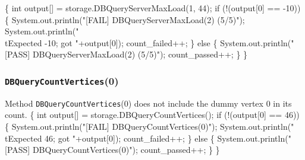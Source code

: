 \documentclass{article}
\def\nwendcode{\endtrivlist \endgroup}
\let\nwdocspar=\par
\begin{document}
\nwenddocs{}\endmoddef{}
\{
  int output[] = storage.DBQueryServerMaxLoad(1, 44);
  if (!(output[0] == -10)) \{
    System.out.println("[FAIL] DBQueryServerMaxLoad(2) (5/5)");
    System.out.println("\\tExpected -10; got "+output[0]);
    count_failed++;
  \} else \{
    System.out.println("[PASS] DBQueryServerMaxLoad(2) (5/5)");
    count_passed++;
  \}
\}
\nwendcode{}\nwdocspar
\subsubsection{{\tt{}DBQueryCountVertices}(0)}
Method {\tt{}DBQueryCountVertices}(0) does not include the dummy vertex 0 in its
count.
\nwenddocs{}\endmoddef{}
\{
  int output[] = storage.DBQueryCountVertices();
  if (!(output[0] == 46)) \{
    System.out.println("[FAIL] DBQueryCountVertices(0)");
    System.out.println("\\tExpected 46; got "+output[0]);
    count_failed++;
  \} else \{
    System.out.println("[PASS] DBQueryCountVertices(0)");
    count_passed++;
  \}
\}
\nwendcode{}\nwdocspar
\end{document}
